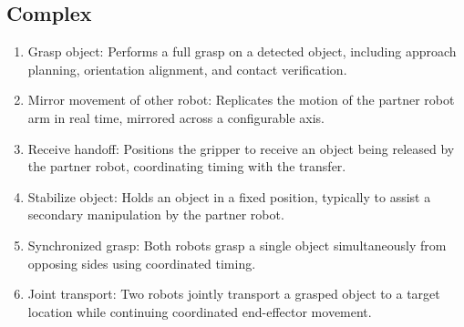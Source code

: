 \documentclass[
     12pt,
     a4paper,
     BCOR=10mm,
     DIV=14,
     listof=totoc,
     bibliography=totoc,
     parskip,
     twoside,
     headsepline
     ]{scrreprt}
\begin{document}
\subsection{Complex}
\begin{enumerate}
	\item Grasp object: Performs a full grasp on a detected object, including approach planning, orientation alignment, and contact verification.
	\item Mirror movement of other robot: Replicates the motion of the partner robot arm in real time, mirrored across a configurable axis.
	\item Receive handoff: Positions the gripper to receive an object being released by the partner robot, coordinating timing with the transfer.
	\item Stabilize object: Holds an object in a fixed position, typically to assist a secondary manipulation by the partner robot.
	\item Synchronized grasp: Both robots grasp a single object simultaneously from opposing sides using coordinated timing.
	\item Joint transport: Two robots jointly transport a grasped object to a target location while continuing coordinated end-effector movement.
\end{enumerate}
\end{document}

